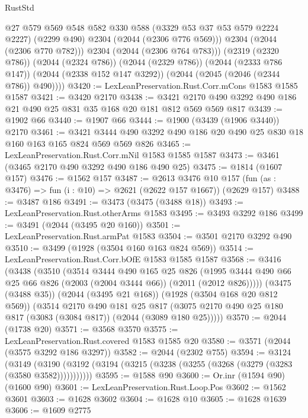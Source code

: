 \begin{lexlean}{RustStd}
\begin{coremodule}
{\begin{coremodule}
{{{{{{{{{{{{{{              @27
              @579
              @569
              @548
              @582
              @330
              @588
              (@3329 @53 @37 @53 @579 @2224 @2227)
              (@2299 @490)
              @2304
              (@2044 (@2306 @776 @569)))
            @2304
            (@2044 (@2306 @770 @782)))
          @2304
          (@2044 (@2306 @764 @783)))
        (@2319 (@2320 @786))
        (@2044 (@2324 @786))
        (@2044 (@2329 @786))
        (@2044 (@2333 @786 @147))
        (@2044 (@2338 @152 @147 @3292))
        (@2044 (@2045 (@2046 (@2344 @786)) @490))))
@3420 := LexLeanPreservation.Rust.Corr.mCons @1583 @1585 @1587
@3421 := @3420 @2170
@3438 := @3421 @2170 @490 @3292 @490 @186 @21 @490 @25 @831 @35 @168 @20 @181 @812 @569 @569 @817
@3439 := @1902 @66
@3440 := @1907 @66
@3444 := @1900 (@3439 (@1906 @3440)) @2170
@3461 := @3421 @3444 @490 @3292 @490 @186 @20 @490 @25 @830 @18 @160 @163 @165 @824 @569 @569 @826
@3465 := LexLeanPreservation.Rust.Corr.mNil @1583 @1585 @1587
@3473 := @3461 (@3465 @2170 @490 @3292 @490 @186 @490 @25)
@3475 := @1814 (@1607 @157)
@3476 := @1562 @157
@3487 := @2613
    @3476
    @10
    @157
    (fun (as : @3476) => fun (i : @10) => @2621 (@2622 @157 @1667))
    (@2629 @157)
@3488 := @3487 @186
@3491 := @3473 (@3475 (@3488 @18))
@3493 := LexLeanPreservation.Rust.otherArms @1583
@3495 := @3493 @3292 @186
@3499 := @3491 (@2044 (@3495 @20 @160))
@3501 := LexLeanPreservation.Rust.armPat @1583
@3504 := @3501 @2170 @3292 @490
@3510 := @3499 (@1928 (@3504 @160 @163 @824 @569))
@3514 := LexLeanPreservation.Rust.Corr.bOfE @1583 @1585 @1587
@3568 := @3416
    (@3438
      (@3510
        (@3514
          @3444
          @490
          @165
          @25
          @826
          (@1995 @3444 @490 @66 @25 @66 @826 (@2003 (@2004 @3444 @66)) (@2011 (@2012 @826)))))
      (@3475 (@3488 @35))
      (@2044 (@3495 @21 @168))
      (@1928 (@3504 @168 @20 @812 @569))
      (@3514
        @2170
        @490
        @181
        @25
        @817
        (@3075 @2170 @490 @25 @180 @817 (@3083 (@3084 @817)) (@2044 (@3089 @180 @25)))))
@3570 := @2044 (@1738 @20)
@3571 := @3568 @3570
@3575 := LexLeanPreservation.Rust.covered @1583 @1585 @20
@3580 := @3571 (@2044 (@3575 @3292 @186 @3297))
@3582 := @2044 (@2302 @755)
@3594 := @3124
    (@3149 (@3190 (@3192 (@3194 (@3215 (@3238 (@3255 (@3268 (@3279 (@3283 (@3580 @3582)))))))))))
@3595 := @1588 @90
@3600 := Or.inr (@1594 @90) (@1600 @90)
@3601 := LexLeanPreservation.Rust.Loop.Pos
@3602 := @1562 @3601
@3603 := @1628 @3602
@3604 := @1628 @10
@3605 := @1628 @1639
@3606 := @1609 @2775
}}}}}}}}}}}}}}
\end{coremodule}}
\end{coremodule}
\end{lexlean}
